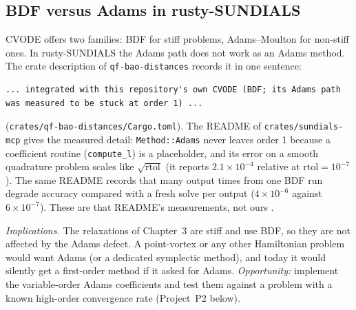\subsection{BDF versus Adams in rusty-SUNDIALS}
CVODE offers two families: BDF for stiff problems, Adams--Moulton for non-stiff ones. In rusty-SUNDIALS the
Adams path does not work as an Adams method. The crate description of \texttt{qf-bao-distances} records it in one
sentence:
\begin{lstlisting}
... integrated with this repository's own CVODE (BDF; its Adams path was measured to be stuck at order 1) ...
\end{lstlisting}
(\texttt{crates/qf-bao-distances/Cargo.toml}). The README of \texttt{crates/sundials-mcp} gives the measured detail:
\texttt{Method::Adams} never leaves order 1 because a coefficient routine (\texttt{compute\_l}) is a placeholder,
and its error on a smooth quadrature problem scales like $\sqrt{\mathrm{rtol}}$ (it reports $2.1\times10^{-4}$
relative at $\mathrm{rtol}=10^{-7}$). The same README records that many output times from one BDF run degrade
accuracy compared with a fresh solve per output ($4\times10^{-6}$ against $6\times10^{-7}$). These are that
README's measurements, not ours \tierX.

\emph{Implications.} The relaxations of Chapter~3 are stiff and use BDF, so they are not affected by the Adams
defect. A point-vortex or any other Hamiltonian problem would want Adams (or a dedicated symplectic method), and
today it would silently get a first-order method if it asked for Adams. \emph{Opportunity:} implement the
variable-order Adams coefficients and test them against a problem with a known high-order convergence rate
(Project~P2 below).

